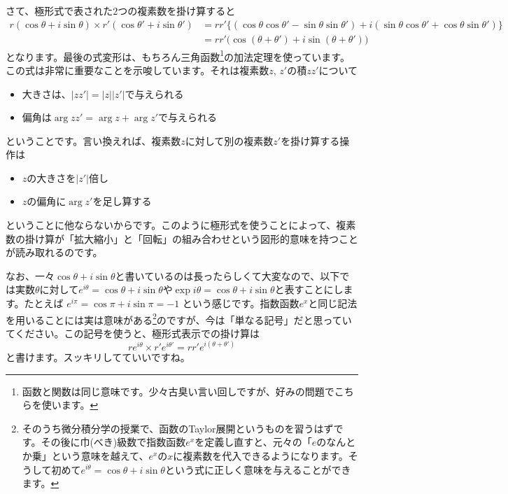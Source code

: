 さて、極形式で表された$2$つの複素数を掛け算すると
\begin{align*}
r(\cos\theta+i\sin\theta) \times r'(\cos\theta'+i\sin\theta')
&= rr'\bigr\{ (\cos\theta\cos\theta' - \sin\theta\sin\theta') + i(\sin\theta\cos\theta'+\cos\theta\sin\theta') \bigl\} \\
&= rr'\bigl(\cos(\theta+\theta') + i\sin(\theta+\theta')\bigr)
\end{align*}
となります。最後の式変形は、もちろん三角函数\footnote{函数と関数は同じ意味です。少々古臭い言い回しですが、好みの問題でこちらを使います。}の加法定理を使っています。この式は非常に重要なことを示唆しています。それは複素数$z$, $z'$の積$zz'$について\vspace{-0.5zw}
\begin{itemize}
\item 大きさは、$|zz'|=|z||z'|$で与えられる
\item 偏角は$\arg zz' = \arg z + \arg z'$で与えられる
\end{itemize}\vspace{-0.5zw}
ということです。言い換えれば、複素数$z$に対して別の複素数$z'$を掛け算する操作は\vspace{-0.5zw}
\begin{itemize}
\item $z$の大きさを$|z'|$倍し
\item $z$の偏角に$\arg z'$を足し算する
\end{itemize}
ということに他ならないからです。このように極形式を使うことによって、複素数の掛け算が「拡大縮小」と「回転」の組み合わせという図形的意味を持つことが読み取れるのです。


なお、一々$\cos\theta+i\sin\theta$と書いているのは長ったらしくて大変なので、以下では実数$\theta$に対して$e^{i\theta} = \cos\theta + i \sin\theta$や$\exp i\theta = \cos\theta + i \sin\theta$と表すことにします。たとえば
$e^{i\pi} = \cos\pi + i\sin\pi = -1$
という感じです。指数函数$e^x$と同じ記法を用いることには実は意味がある\footnote{そのうち微分積分学の授業で、函数のTaylor展開というものを習うはずです。その後に巾(べき)級数で指数函数$e^x$を定義し直すと、元々の「$e$のなんとか乗」という意味を越えて、$e^x$の$x$に複素数を代入できるようになります。そうして初めて$e^{i\theta}=\cos\theta+i\sin\theta$という式に正しく意味を与えることができます。}のですが、今は「単なる記号」だと思っていてください。この記号を使うと、極形式表示での掛け算は
\[
re^{i\theta} \times r'e^{i\theta'} = rr'e^{i(\theta+\theta')}
\]
と書けます。スッキリしてていいですね。

